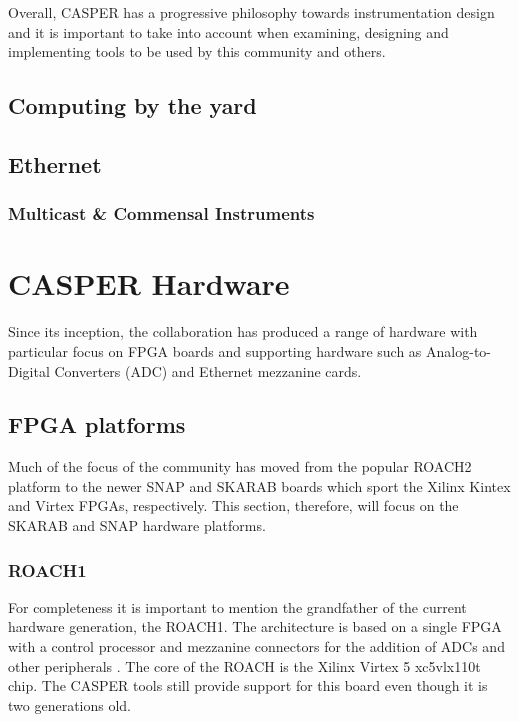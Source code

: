 \documentclass{ws-jai}
\begin{document}
Overall, CASPER has a progressive philosophy towards instrumentation design and it is important to take into account when examining, designing and implementing tools to be used by this community and others.

\subsection{Computing by the yard}

\subsection{Ethernet}

\subsubsection{Multicast \& Commensal Instruments}


\section{CASPER Hardware} \label{sec:Hardware}

Since its inception, the collaboration has produced a range of hardware with particular focus on FPGA boards and supporting hardware such as Analog-to-Digital Converters (ADC) and Ethernet mezzanine cards.

\subsection{FPGA platforms}

Much of the focus of the community has moved from the popular ROACH2 platform to the newer SNAP and SKARAB boards which sport the Xilinx Kintex and Virtex FPGAs, respectively. This section, therefore, will focus on the SKARAB and SNAP hardware platforms.

\subsubsection{ROACH1}

For completeness it is important to mention the grandfather of the current hardware generation, the ROACH1. The architecture is based on a single FPGA with a control processor and mezzanine connectors for the addition of ADCs and other peripherals \cite{Casp09}. The core of the ROACH is the Xilinx Virtex 5 xc5vlx110t chip. The CASPER tools still provide support for this board even though it is two generations old.
\end{document}
